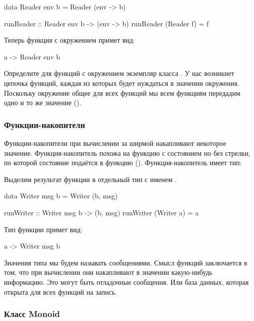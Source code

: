 \begin{code}
data Reader env b = Reader (env -> b)

runReader :: Reader env b -> (env -> b)
runReader (Reader f) = f
\end{code}

Теперь функция с окружением примет вид:

\begin{code}
a -> Reader env b
\end{code}

Определите для функций с окружением экземпляр класса .
У нас возникнет цепочка функций, каждая из которых будет
нуждаться в значении окружения. Поскольку окружение общее для 
всех функций мы всем функциям передадим одно и то же значение
().


\subsubsection{Функции-накопители}

Функции-накопители при вычислении за ширмой накапливают
некоторое значение. Функция-накопитель похожа на 
функцию с состоянием но без стрелки, по которой состояние подаётся
в функцию ().
Функция-накопитель имеет тип: 


Выделим результат функции в отдельный тип с именем . 

\begin{code}
data Writer msg b = Writer (b, msg)

runWriter :: Writer msg b -> (b, msg)
runWriter (Writer a) = a
\end{code}

Тип функции примет вид:

\begin{code}
a -> Writer msg b
\end{code}

Значения типа  мы будем называть сообщениями.
Смысл функций \mbox{} заключается в том, что
при вычислении они накапливают в значении 
какую-нибудь информацию. Это могут быть отладочные сообщения.
Или база данных, которая открыта для всех функций на запись. 

\subsubsection{Класс Monoid}

